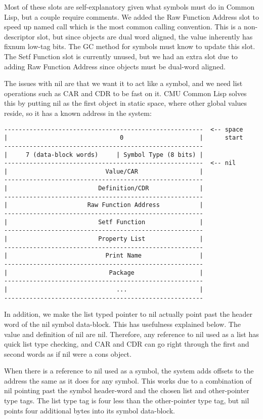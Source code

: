 Most of these slots are self-explanatory given what symbols must do in Common
Lisp, but a couple require comments.  We added the Raw Function Address slot to
speed up named call which is the most common calling convention.  This is a
non-descriptor slot, but since objects are dual word aligned, the value
inherently has fixnum low-tag bits.  The GC method for symbols must know to
update this slot.  The Setf Function slot is currently unused, but we had an
extra slot due to adding Raw Function Address since objects must be dual-word
aligned.

The issues with nil are that we want it to act like a symbol, and we need list
operations such as CAR and CDR to be fast on it.  CMU Common Lisp solves this
by putting nil as the first object in static space, where other global values
reside, so it has a known address in the system:
\begin{verbatim}
-------------------------------------------------------  <-- space
|                               0                     |      start
-------------------------------------------------------
|     7 (data-block words)     | Symbol Type (8 bits) |
-------------------------------------------------------  <-- nil
|                           Value/CAR                 |
-------------------------------------------------------
|                         Definition/CDR              |
-------------------------------------------------------
|                      Raw Function Address           |
-------------------------------------------------------
|                         Setf Function               |
-------------------------------------------------------
|                         Property List               |
-------------------------------------------------------
|                           Print Name                |
-------------------------------------------------------
|                            Package                  |
-------------------------------------------------------
|                              ...                    |
-------------------------------------------------------
\end{verbatim}
In addition, we make the list typed pointer to nil actually point past the
header word of the nil symbol data-block.  This has usefulness explained below.
The value and definition of nil are nil.  Therefore, any reference to nil used
as a list has quick list type checking, and CAR and CDR can go right through
the first and second words as if nil were a cons object.

When there is a reference to nil used as a symbol, the system adds offsets to
the address the same as it does for any symbol.  This works due to a
combination of nil pointing past the symbol header-word and the chosen list and
other-pointer type tags.  The list type tag is four less than the other-pointer
type tag, but nil points four additional bytes into its symbol data-block.


